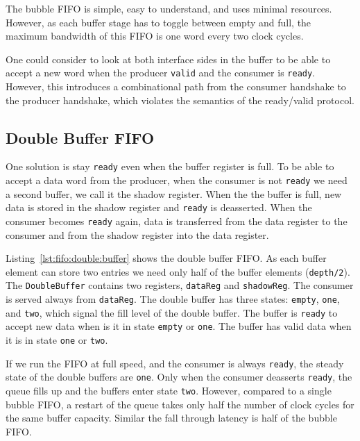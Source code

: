 \documentclass[%
    10pt,
    headinclude, footexclude,
    openright, %
    notitlepage,
    cleardoubleempty,
    headsepline,
    pointlessnumbers,
    bibtotoc, idxtotoc,
    ]{scrbook}
\newcommand{\code}[1]{{\lstinline[basicstyle=\small\ttfamily]{#1}}}
\begin{document}
The bubble FIFO is simple, easy to understand, and uses minimal resources.
However, as each buffer stage has to toggle between empty and full, the maximum
bandwidth of this FIFO is one word every two clock cycles.

One could consider to look at both interface sides in the buffer to be able to accept
a new word when the producer \code{valid} and the consumer is \code{ready}.
However, this introduces a combinational path from the consumer handshake
to the producer handshake, which violates the semantics of the ready/valid protocol.

\subsection{Double Buffer FIFO}


One solution is stay \code{ready} even when the buffer register is full.
To be able to accept a data word from the producer, when the consumer is not
\code{ready} we need a second buffer, we call it the shadow register.
When the the buffer is full, new data is stored in the shadow register and \code{ready}
is deasserted. When the consumer becomes \code{ready} again, data is transferred
from the data register to the consumer and from the shadow register into
the data register.

\newpage
{}


Listing~\ref{lst:fifo:double:buffer} shows the double buffer FIFO. As each buffer element
can store two entries we need only half of the buffer elements (\code{depth/2}).
The \code{DoubleBuffer} contains two registers,
\code{dataReg} and \code{shadowReg}. The consumer is served always from
\code{dataReg}. The double buffer has three states: \code{empty}, \code{one},
and \code{two}, which signal the fill level of the double buffer.
The buffer is \code{ready} to accept new data when is it in state \code{empty}
or \code{one}. The buffer has valid data when it is in state \code{one} or \code{two}.

If we run the FIFO at full speed, and the consumer is always \code{ready},
the steady state of the double buffers are \code{one}. Only when the consumer
deasserts \code{ready}, the queue fills up and the buffers enter state \code{two}.
However, compared to a single bubble FIFO, a restart of the queue takes
only half the number of clock cycles for the same buffer capacity.
Similar the fall through latency is half of the bubble FIFO.
\end{document}
